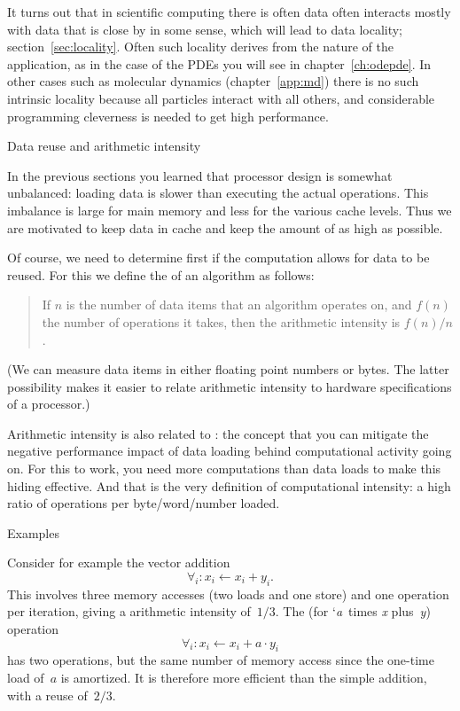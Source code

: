 It turns out that in scientific computing there is often data often
interacts mostly with data that is close by in some sense, which will
lead to data locality; section~\ref{sec:locality}. Often such locality
derives from the nature of the application, as in the case of the \acp{PDE} you
will see in chapter~\ref{ch:odepde}. In other cases such as molecular
dynamics (chapter~\ref{app:md}) there is no such intrinsic locality
because all particles interact with all others,
and considerable programming cleverness is needed to get high performance.

 {Data reuse and arithmetic intensity}
\label{sec:reuse}
\label{sec:gemm}
\label{sec:intensity}

In the previous sections you learned that processor design is somewhat unbalanced:
loading data is slower than executing the actual operations.
This imbalance is large for main memory and less for the various cache levels.
Thus we are motivated to keep data in cache and 
keep the amount of   as high as possible.

Of course, we need to determine first if the computation allows for data to be
reused.
For this we define the  
of an algorithm as follows:
\begin{quote}
  If $n$ is the number of data items that an algorithm operates on, and
  $f(n)$ the number of operations it takes, then the arithmetic intensity is
  $f(n)/n$.
\end{quote}
(We can measure data items in either floating point numbers or bytes.
The latter possibility makes it easier to relate arithmetic intensity
to hardware specifications of a processor.)

Arithmetic intensity is also related to :
the concept that you can mitigate the negative performance impact
of data loading
behind computational activity going on.
%
For this to work, you need more computations than data loads to make
this hiding effective. And that is the very definition of
computational intensity: a high ratio of operations per
byte/word/number loaded.

 {Examples}

Consider for example the vector addition 
\[ \forall_i\colon x_i\leftarrow x_i+y_i.
\]
This involves three memory accesses (two loads and one store) 
and one operation per iteration,
giving a arithmetic intensity of~$1/3$. The  (for
`\emph{a}~times \emph{x} plus~\emph{y}) operation 
\[ \forall_i\colon x_i\leftarrow x_i+a\cdot y_i
\]
has
two operations, but the same number of memory access since the
one-time load of~$a$ is amortized. It is therefore more efficient
than the simple addition, with a reuse of~$2/3$.

